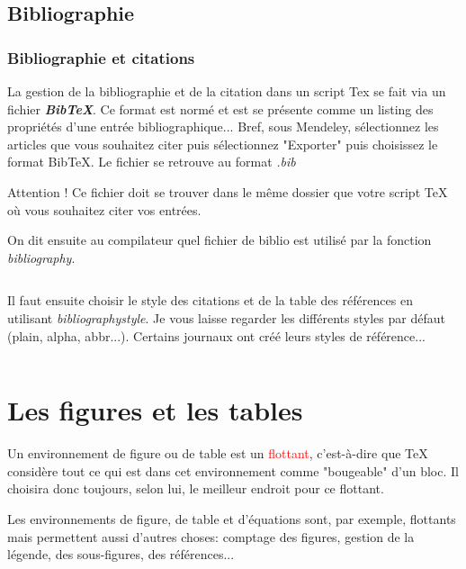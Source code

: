 \documentclass{beamer}
\begin{document}
\subsection[Biblio]{Bibliographie}
\begin{frame}[fragile]
	\frametitle{Bibliographie et citations}
	La gestion de la bibliographie et de la citation dans un script Tex se fait via un fichier \textit{\textbf{BibTeX}}. Ce format est normé et est se présente comme un listing des propriétés d'une entrée bibliographique... Bref, sous Mendeley, sélectionnez les articles que vous souhaitez citer puis sélectionnez "Exporter" puis choisissez le format BibTeX. Le fichier se retrouve au format \textit{.bib}
	\newline
	
	\alert{Attention !} Ce fichier doit se trouver dans le même dossier que votre script TeX où vous souhaitez citer vos entrées.
\end{frame}

\begin{frame}[fragile]
On dit ensuite au compilateur quel fichier de biblio est utilisé par la fonction \textit{bibliography}.

\begin{Verbatim}

\end{Verbatim}
\vspace{.2cm}
Il faut ensuite choisir le style des citations et de la table des références en utilisant \textit{bibliographystyle}. Je vous laisse regarder les différents styles par défaut (plain, alpha, abbr...). Certains journaux ont créé leurs styles de référence...

\begin{Verbatim}

\end{Verbatim}
\end{frame}

\section{Les figures et les tables}
\begin{frame}[fragile]

\begin{definition}
Un environnement de figure ou de table est un \textcolor{red}{flottant}, c'est-à-dire que TeX considère tout ce qui est dans cet environnement comme "bougeable" d'un bloc. Il choisira donc toujours, selon lui, le meilleur endroit pour ce flottant.
\end{definition}
\vspace{.4cm}
Les environnements de figure, de table et d'équations sont, par exemple, flottants mais permettent aussi d'autres choses: comptage des figures, gestion de la légende, des sous-figures, des références...

\end{frame}
\end{document}
